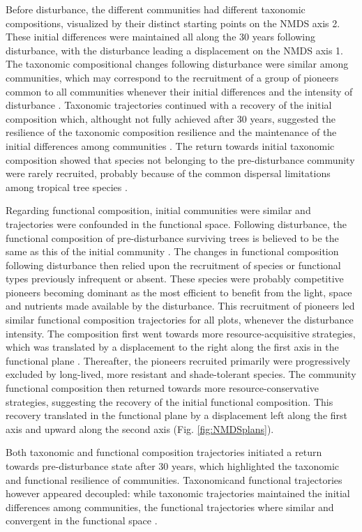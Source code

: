 \documentclass[fleqn,10pt]{ArtEcoFoG} %
\begin{document}
Before disturbance, the different communities had different taxonomic
compositions, visualized by their distinct starting points on the NMDS
axis 2. These initial differences were maintained all along the 30 years
following disturbance, with the disturbance leading a displacement on
the NMDS axis 1. The taxonomic compositional changes following
disturbance were similar among communities, which may correspond to the
recruitment of a group of pioneers common to all communities whenever
their initial differences and the intensity of disturbance
\citep{Denslow2000, Bongers2009}. Taxonomic trajectories continued with
a recovery of the initial composition which, althought not fully
achieved after 30 years, suggested the resilience of the taxonomic
composition resilience and the maintenance of the initial differences
among communities \citep{Folke2006}. The return towards initial
taxonomic composition showed that species not belonging to the
pre-disturbance community were rarely recruited, probably because of the
common dispersal limitations among tropical tree species
\citep{Svenning2005}.

Regarding functional composition, initial communities were similar and
trajectories were confounded in the functional space. Following
disturbance, the functional composition of pre-disturbance surviving
trees is believed to be the same as this of the initial community
\citep{Herault2018}. The changes in functional composition following
disturbance then relied upon the recruitment of species or functional
types previously infrequent or absent. These species were probably
competitive pioneers becoming dominant as the most efficient to benefit
from the light, space and nutrients made available by the disturbance.
This recruitment of pioneers led similar functional composition
trajectories for all plots, whenever the disturbance intensity. The
composition first went towards more resource-acquisitive strategies,
which was translated by a displacement to the right along the first axis
in the functional plane \citep{Westoby1998, Wright2004, Reich2014}.
Thereafter, the pioneers recruited primarily were progressively excluded
by long-lived, more resistant and shade-tolerant species. The community
functional composition then returned towards more resource-conservative
strategies, suggesting the recovery of the initial functional
composition. This recovery translated in the functional plane by a
displacement left along the first axis and upward along the second axis
(Fig. \ref{fig:NMDSplans}).

Both taxonomic and functional composition trajectories initiated a
return towards pre-disturbance state after 30 years, which highlighted
the taxonomic and functional resilience of communities. Taxonomicand
functional trajectories however appeared decoupled: while taxonomic
trajectories maintained the initial differences among communities, the
functional trajectories where similar and convergent in the functional
space \citep{Fukami2005}.
\end{document}
